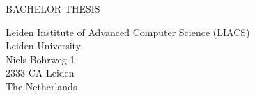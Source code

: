 \documentclass[12pt]{article}
\begin{document}
\begin{large}
\vspace*{3.5cm}

\hspace*{2.5cm}BACHELOR THESIS

\vspace*{1mm}

\hspace*{2.5cm}Leiden Institute of Advanced Computer Science (LIACS)\\
\hspace*{2.5cm}Leiden University\\
\hspace*{2.5cm}Niels Bohrweg 1\\
\hspace*{2.5cm}2333 CA Leiden\\
\hspace*{2.5cm}The Netherlands\\
\hspace*{2.5mm}\ 

\end{large}
\end{document}
